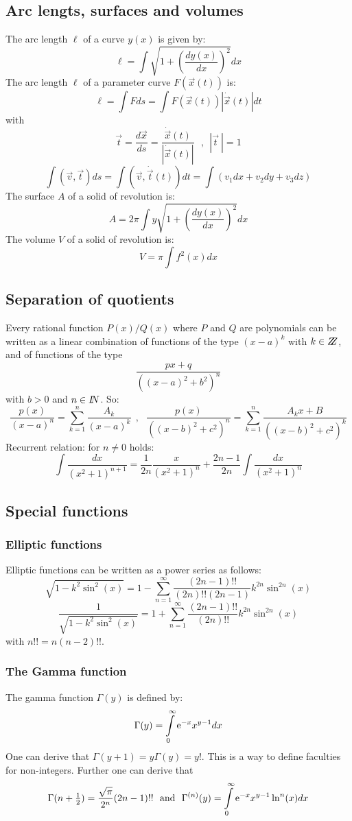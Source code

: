 \documentclass[twoside]{report}
\begin{document}
\subsection{Arc lengts, surfaces and volumes}
The arc length $\ell$ of a curve $y(x)$ is given by:
\[
\ell=\int\sqrt{1+\left(\frac{dy(x)}{dx}\right)^2}dx
\]
The arc length $\ell$ of a parameter curve $F(\vec{x}(t))$ is:
\[
\ell=\int Fds=\int F(\vec{x}(t))|\dot{\vec{x}}(t)|dt
\]
with
\[
\vec{t}=\frac{d\vec{x}}{ds}=\frac{\dot{\vec{x}}(t)}{|\dot{\vec{x}}(t)|}~~~,~~|\vec{t}~|=1
\]
\[
\int(\vec{v},\vec{t})ds=\int(\vec{v},\dot{\vec{t}}(t))dt=\int(v_1dx+v_2dy+v_3dz)
\]
The surface $A$ of a solid of revolution is:
\[
A=2\pi\int y\sqrt{1+\left(\frac{dy(x)}{dx}\right)^2}dx
\]
The volume $V$ of a solid of revolution is:
\[
V=\pi\int f^2(x)dx
\]

\subsection{Separation of quotients}
\label{sec:breuksplits}
Every rational function $P(x)/Q(x)$ where $P$ and $Q$ are polynomials can be
written as a linear combination of functions of the type $(x-a)^k$ with
$k\in Z\hspace{-1ex}Z$, and of functions of the type
\[
\frac{px+q}{((x-a)^2+b^2)^n}
\]
with $b>0$ and $n\in I\hspace{-1mm}N$. So:
\[
\frac{p(x)}{(x-a)^n}=\sum_{k=1}^n\frac{A_k}{(x-a)^k}~~,~~~
\frac{p(x)}{((x-b)^2+c^2)^n}=\sum_{k=1}^n \frac{A_kx+B}{((x-b)^2+c^2)^k}
\]
Recurrent relation: for $n\neq0$ holds:
\[
\int\frac{dx}{(x^2+1)^{n+1}}=\frac{1}{2n}\frac{x}{(x^2+1)^n}+\frac{2n-1}{2n}\int\frac{dx}{(x^2+1)^n}
\]

\subsection{Special functions}
\subsubsection{Elliptic functions}
Elliptic functions can be written as a power series as follows:
\[
\sqrt{1-k^2\sin^2(x)}=1-\sum_{n=1}^\infty\frac{(2n-1)!!}{(2n)!!(2n-1)}k^{2n}\sin^{2n}(x)
\]
\[
\frac{1}{\sqrt{1-k^2\sin^2(x)}}=1+\sum_{n=1}^\infty\frac{(2n-1)!!}{(2n)!!}k^{2n}\sin^{2n}(x)
\]
with $n!!=n(n-2)!!$.

\subsubsection{The Gamma function}
The gamma function $\Gamma(y)$ is defined by:
\[
\Gamma(y)=\int\limits_0^\infty{\rm e}^{-x}x^{y-1}dx
\]
One can derive that $\Gamma(y+1)=y\Gamma(y)=y!$. This is a way to define
faculties for non-integers. Further one can derive that
\[
\Gamma(n+\mbox{$\frac{1}{2}$})=\frac{\sqrt{\pi}}{2^n}(2n-1)!!~~\mbox{and}~~
\Gamma^{(n)}(y)=\int\limits_0^\infty{\rm e}^{-x}x^{y-1}\ln^n(x)dx
\]
\end{document}
